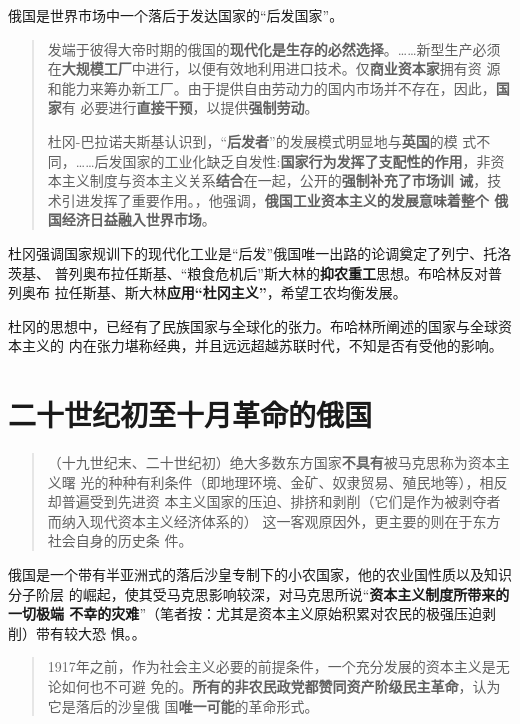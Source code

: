 俄国是世界市场中一个落后于发达国家的“后发国家”。
\begin{quotation}
  发端于彼得大帝时期的俄国的\textbf{现代化是生存的必然选择}。……新型生产必须
  在\textbf{大规模工厂}中进行，以便有效地利用进口技术。仅\textbf{商业资本家}拥有资
  源和能力来筹办新工厂。由于提供自由劳动力的国内市场并不存在，因此，\textbf{国家}有
  必要进行\textbf{直接干预}，以提供\textbf{强制劳动}。

  杜冈-巴拉诺夫斯基认识到，“\textbf{后发者}”的发展模式明显地与\textbf{英国}的模
  式不同，……后发国家的工业化缺乏自发性:\textbf{国家行为发挥了支配性的作用}，非资
  本主义制度与资本主义关系\textbf{结合}在一起，公开的\textbf{强制补充了市场训
    诫}，技术引进发挥了重要作用。，他强调，\textbf{俄国工业资本主义的发展意味着整个
    俄国经济日益融入世界市场}。 
\end{quotation}

杜冈强调国家规训下的现代化工业是“后发”俄国唯一出路的论调奠定了列宁、托洛茨基、
普列奥布拉任斯基、``粮食危机后''斯大林的\textbf{抑农重工}思想。布哈林反对普列奥布
拉任斯基、斯大林\textbf{应用“杜冈主义”}，希望工农均衡发展。

杜冈的思想中，已经有了民族国家与全球化的张力。布哈林所阐述的国家与全球资本主义的
内在张力堪称经典，并且远远超越苏联时代，不知是否有受他的影响。

\section{二十世纪初至十月革命的俄国}

\begin{quotation}
  （十九世纪末、二十世纪初）绝大多数东方国家\textbf{不具有}被马克思称为资本主义曙
  光的种种有利条件（即地理环境、金矿、奴隶贸易、殖民地等），相反却普遍受到先进资
  本主义国家的压迫、排挤和剥削（它们是作为被剥夺者而纳入现代资本主义经济体系的）
  这一客观原因外，更主要的则在于东方社会自身的历史条
  件。
\end{quotation}

俄国是一个带有半亚洲式的落后沙皇专制下的小农国家，他的农业国性质以及知识分子阶层
的崛起，使其受马克思影响较深，对马克思所说“\textbf{资本主义制度所带来的一切极端
  不幸的灾难}”（笔者按：尤其是资本主义原始积累对农民的极强压迫剥削）带有较大恐
惧。。

\begin{quotation}
  1917年之前，作为社会主义必要的前提条件，一个充分发展的资本主义是无论如何也不可避
  免的。\textbf{所有的非农民政党都赞同资产阶级民主革命}，认为它是落后的沙皇俄
  国\textbf{唯一可能}的革命形式。
\end{quotation}

